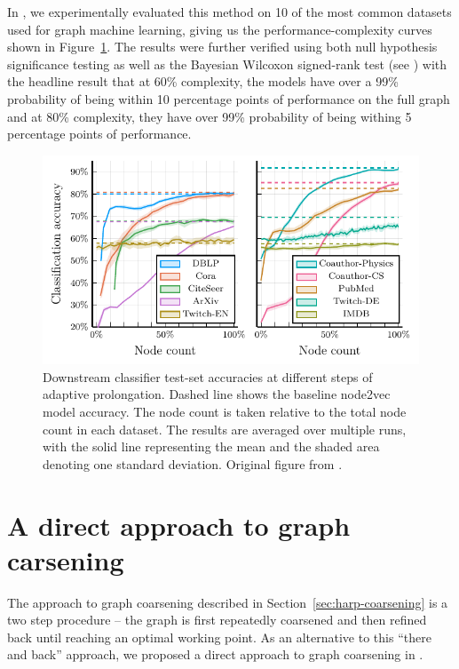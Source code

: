 In \cite{dedic_balancing_2024}, we experimentally evaluated this method on 10 of the most common datasets used for graph machine learning, giving us the performance-complexity curves shown in Figure~\ref{fig:adaptive-coarsening}. The results were further verified using both null hypothesis significance testing as well as the Bayesian Wilcoxon signed-rank test (see \cite{benavoli_bayesian_2014}) with the headline result that at 60\% complexity, the models have over a 99\% probability of being within 10 percentage points of performance on the full graph and at 80\% complexity, they have over 99\% probability of being withing 5 percentage points of performance.

\begin{figure}
	\includegraphics[width=0.8\linewidth]{images/adaptive-coarsening/adaptive-coarsening.pdf}
	\caption{Downstream classifier test-set accuracies at different steps of adaptive prolongation. Dashed line shows the baseline node2vec model accuracy. The node count is taken relative to the total node count in each dataset. The results are averaged over multiple runs, with the solid line representing the mean and the shaded area denoting one standard deviation. Original figure from \cite{dedic_balancing_2024}.}
	\label{fig:adaptive-coarsening}
\end{figure}

\section{A direct approach to graph carsening}

The approach to graph coarsening described in Section~\ref{sec:harp-coarsening} is a two step procedure -- the graph is first repeatedly coarsened and then refined back until reaching an optimal working point. As an alternative to this \enquote{there and back} approach, we proposed a direct approach to graph coarsening in \cite{prochazka_scalable_2022}.

